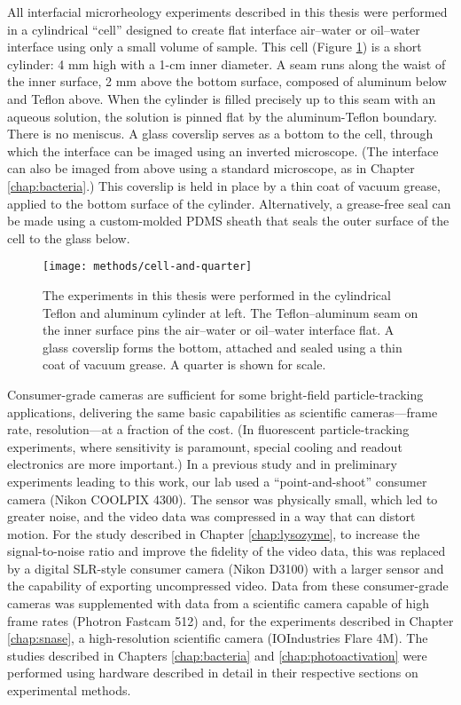 All interfacial microrheology experiments described in this thesis were performed in a cylindrical ``cell'' designed to create flat interface air--water or oil--water interface using only a small volume of sample. This cell (Figure \ref{fig:cell-and-quarter}) is a short cylinder: 4 mm high with a 1-cm inner diameter. A seam runs along the waist of the inner surface, 2 mm above the bottom surface, composed of aluminum below and Teflon above. When the cylinder is filled precisely up to this seam with an aqueous solution, the solution is pinned flat by the aluminum-Teflon boundary. There is no meniscus. A glass coverslip serves as a bottom to the cell, through which the interface can be imaged using an inverted microscope. (The interface can also be imaged from above using a standard microscope, as in Chapter \ref{chap:bacteria}.) This coverslip is held in place by a thin coat of vacuum grease, applied to the bottom surface of the cylinder. Alternatively, a grease-free seal can be made using a custom-molded PDMS sheath that seals the outer surface of the cell to the glass below.

   \begin{figure}
    \centering
    \texttt{[image: methods/cell-and-quarter]}
    \caption{\label{fig:cell-and-quarter}The experiments in this thesis were performed in the cylindrical Teflon and aluminum cylinder at left. The Teflon--aluminum seam on the inner surface pins the air--water or oil--water interface flat. A glass coverslip forms the bottom, attached and sealed using a thin coat of vacuum grease. A quarter is shown for scale.}
    \end{figure}

Consumer-grade cameras are sufficient for some bright-field particle-tracking applications, delivering the same basic capabilities as scientific cameras---frame rate, resolution---at a fraction of the cost. (In fluorescent particle-tracking experiments, where sensitivity is paramount, special cooling and readout electronics are more important.) In a previous study and in preliminary experiments leading to this work, our lab used a ``point-and-shoot'' consumer camera (Nikon COOLPIX 4300). The sensor was physically small, which led to greater noise, and the video data was compressed in a way that can distort motion. For the study described in Chapter \ref{chap:lysozyme}, to increase the signal-to-noise ratio and improve the fidelity of the video data, this was replaced by a digital SLR-style consumer camera (Nikon D3100) with a larger sensor and the capability of exporting uncompressed video. Data from these consumer-grade cameras was supplemented with data from a scientific camera capable of high frame rates (Photron Fastcam 512) and, for the experiments described in Chapter \ref{chap:snase}, a high-resolution scientific camera (IOIndustries Flare 4M). The studies described in Chapters \ref{chap:bacteria} and \ref{chap:photoactivation} were performed using hardware described in detail in their respective sections on experimental methods.

